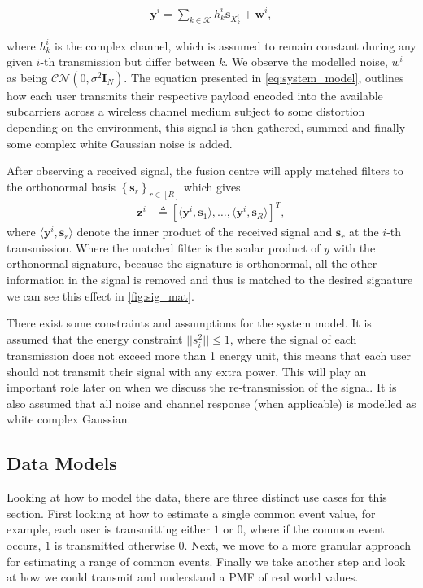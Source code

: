 \documentclass{article}
\begin{document}
\begin{align}
    \boldsymbol{y}^i = \sum_{k \in \mathcal{K}} h^i_k \boldsymbol{s}_{X^i_k} + \boldsymbol{w}^i, \label{eq:system_model}
\end{align}

where $h_k^i$ is the complex channel, which is assumed to remain constant during any given $i$-th transmission but differ between $k$. We observe the modelled noise, $w^i$ as being $\mathcal{CN}(0, \sigma^2 \boldsymbol{I}_N)$. The equation presented in \cref{eq:system_model}, outlines how each user transmits their respective payload encoded into the available subcarriers across a wireless channel medium subject to some distortion depending on the environment, this signal is then gathered, summed and finally some complex white Gaussian noise is added.


After observing a received signal, the fusion centre will apply matched filters to the orthonormal basis $\left\{ \boldsymbol{s}_r\right\}_{r \in [R]}$ which gives
%
\begin{align}
    \boldsymbol{z}^i &\triangleq \left[\langle \boldsymbol{y}^i, \boldsymbol{s}_1\rangle, \ldots, \langle \boldsymbol{y}^i, \boldsymbol{s}_R\rangle  \right]^T, \label{eq:mf_output}
\end{align}
%
where $\langle \boldsymbol{y}^i, \boldsymbol{s}_r\rangle$ denote the inner product of the received signal and $\boldsymbol{s}_r$ at the $i$-th transmission. Where the matched filter is the scalar product of $y$ with the orthonormal signature, because the signature is orthonormal, all the other information in the signal is removed and thus is matched to the desired signature we can see this effect in \cref{fig:sig_mat}. 

There exist some constraints and assumptions for the system model. It is assumed that the energy constraint $||s_{i}^2|| \leq 1$, where the signal of each transmission does not exceed more than 1 energy unit, this means that each user should not transmit their signal with any extra power. This will play an important role later on when we discuss the re-transmission of the signal. It is also assumed that all noise and channel response (when applicable) is modelled as white complex Gaussian.   

\subsection{Data Models}\label{data_models}

Looking at how to model the data, there are three distinct use cases for this section. First looking at how to estimate a single common event value, for example, each user is transmitting either $1$ or $0$, where if the common event occurs, $1$ is transmitted otherwise 0. Next, we move to a more granular approach for estimating a range of common events. Finally we take another step and look at how we could transmit and understand a PMF of real world values. 
\end{document}
